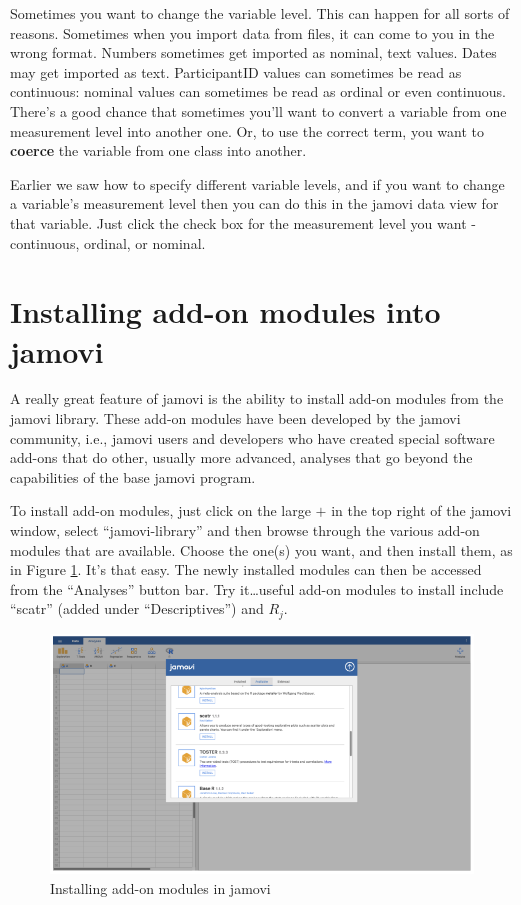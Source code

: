 \documentclass[
]{book}
\begin{document}
Sometimes you want to change the variable level. This can happen for all sorts of reasons. Sometimes when you import data from files, it can come to you in the wrong format. Numbers sometimes get imported as nominal, text values. Dates may get imported as text. ParticipantID values can sometimes be read as continuous: nominal values can sometimes be read as ordinal or even continuous. There's a good chance that sometimes you'll want to convert a variable from one measurement level into another one. Or, to use the correct term, you want to \textbf{coerce} the variable from one class into another.

Earlier we saw how to specify different variable levels, and if you want to change a variable's measurement level then you can do this in the jamovi data view for that variable. Just click the check box for the measurement level you want - continuous, ordinal, or nominal.

\hypertarget{installing-add-on-modules-into-jamovi}{%
\section{Installing add-on modules into jamovi}\label{installing-add-on-modules-into-jamovi}}

A really great feature of jamovi is the ability to install add-on modules from the jamovi library. These add-on modules have been developed by the jamovi community, i.e., jamovi users and developers who have created special software add-ons that do other, usually more advanced, analyses that go beyond the capabilities of the base jamovi program.

To install add-on modules, just click on the large \(+\) in the top right of the jamovi window, select ``jamovi-library'' and then browse through the various add-on modules that are available. Choose the one(s) you want, and then install them, as in Figure \ref{fig:fig3-6}. It's that easy. The newly installed modules can then be accessed from the ``Analyses'' button bar. Try it\ldots useful add-on modules to install include ``scatr'' (added under ``Descriptives'') and \(R_j\).

\begin{figure}
\includegraphics[width=0.9\linewidth]{images/Figure7} \caption{Installing add-on modules in jamovi}\label{fig:fig3-6}
\end{figure}
\end{document}

